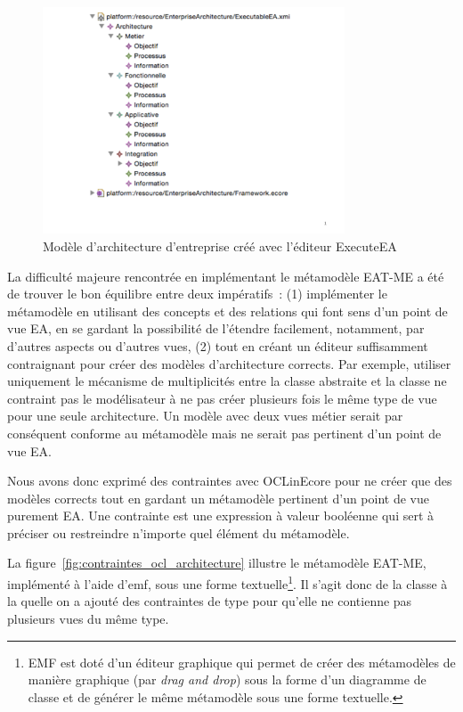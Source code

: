     \begin{figure}[!htbp]
      \centering
      \includegraphics[trim=0cm 3cm 0cm 0cm, width=0.8\textwidth]{figures/5_implementation/modele_ea.pdf}
     \caption{Modèle d'architecture d'entreprise créé avec l'éditeur ExecuteEA}
     \label{fig:modeleEA}
    \end{figure}

    La difficulté majeure rencontrée en implémentant le métamodèle EAT-ME a été de
    trouver le bon équilibre entre deux impératifs~: (1) implémenter le
    métamodèle en utilisant des concepts et des relations qui font sens d'un
    point de vue EA, en se gardant la possibilité de l'étendre facilement,
    notamment, par d'autres aspects ou d'autres vues, (2) tout en créant un
    éditeur suffisamment contraignant pour créer des modèles d'architecture
    corrects. Par exemple, utiliser uniquement le mécanisme de multiplicités
    entre la classe abstraite  et la classe  ne contraint
    pas le modélisateur à ne pas créer plusieurs fois le même type de vue pour
    une seule architecture. Un modèle avec deux vues métier serait par
    conséquent conforme au métamodèle mais ne serait pas pertinent d'un point de
    vue EA.

    Nous avons donc exprimé des contraintes avec OCLinEcore pour ne créer que
    des modèles corrects tout en gardant un métamodèle pertinent d'un point de
    vue purement EA.  Une contrainte est une expression à valeur booléenne qui
    sert à préciser ou restreindre n'importe quel élément du métamodèle.

    La figure~\ref{fig:contraintes_ocl_architecture} illustre le métamodèle
    EAT-ME, implémenté à l'aide d'\gls{emf}, sous une forme textuelle\footnote{EMF
    est doté d'un éditeur graphique qui permet de créer des métamodèles de
    manière graphique (par \emph{drag and drop}) sous la forme d'un diagramme de
    classe et de générer le même métamodèle sous une forme textuelle.}. Il
    s'agit donc de la classe  à la quelle on a ajouté des
    contraintes de type  pour qu'elle ne contienne pas plusieurs vues du
    même type.

